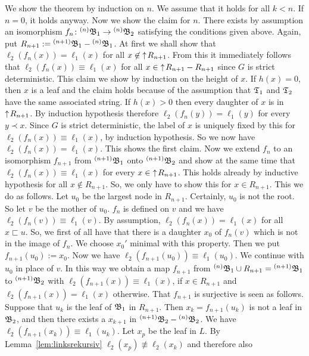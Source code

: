 \proofbeg
We show the theorem by induction on $n$. We assume that it holds
for all $k < n$. If $n = 0$, it holds anyway. Now we show
the claim for $n$. There exists by assumption an isomorphism
$f_n \colon {^{(n)}\mathfrak{B}_1} \rightarrow {^{(n)}\mathfrak{B}_2}$ satisfying the
conditions given above. Again, put $R_{n+1} := {^{(n+1)}\GB_1} %
- {^{(n)}\GB_1}$. At first we shall show that $\ell_2(f_n(x)) =
\ell_1(x)$ for all $x \not\in {\uparrow\! R_{n+1}}$. From this it
immediately follows that $\ell_2(f_n(x)) \equiv \ell_1(x)$ for all
$x \in {\uparrow\! R_{n+1}} - R_{n+1}$ since $G$ is strict
deterministic. This claim we show by induction on the height of
$x$. If $h(x) = 0$, then $x$ is a leaf and the claim holds because
of the assumption that $\mathfrak{T}_1$ and $\mathfrak{T}_2$ have the same
associated string. If $h(x) > 0$ then every daughter of $x$ is in
${\uparrow\! R_{n+1}}$. By induction hypothesis therefore
$\ell_2(f_n(y)) = \ell_1(y)$ for every $y \prec x$. Since $G$ is
strict deterministic, the label of $x$ is uniquely fixed by this
for $\ell_2(f_n(x)) \equiv \ell_1(x)$, by induction hypothesis. So
we now have $\ell_2(f_n(x)) = \ell_1(x)$. This shows the first
claim. Now we extend $f_n$ to an isomorphism $f_{n+1}$ from
${^{(n+1)}\mathfrak{B}_1}$ onto ${^{(n+1)}\mathfrak{B}_2}$ and show at the same time
that $\ell_2(f_n(x)) \equiv \ell_1(x)$ for every $x \in
{\uparrow\! R_{n+1}}$. This holds already by inductive hypothesis for
all $x \not\in R_{n+1}$. So, we only have to show this for $x \in
R_{n+1}$. This we do as follows. Let $u_0$ be the largest node in
$R_{n+1}$. Certainly, $u_0$ is not the root. So let $v$ be the
mother of $u_0$. $f_n$ is defined on $v$ and we have
$\ell_2(f_n(v)) \equiv \ell_1(v)$. By assumption, $\ell_2(f_n(x))
= \ell_1(x)$ for all $x \sqsubset u$. So, we first of all have
that there is a daughter $x_0$ of $f_n(v)$ which is not in the
image of $f_n$. We choose $x_0'$ minimal with this property. Then
we put $f_{n+1}(u_0) := x_0$. Now we have $\ell_2(f_{n+1}(u_0))
\equiv \ell_1(u_0)$. We continue with $u_0$ in place of $v$. In
this way we obtain a map $f_{n+1}$ from ${^{(n)}\mathfrak{B}_1} \cup
R_{n+1} = {^{(n+1)}\mathfrak{B}_1}$ to ${^{(n+1)}\mathfrak{B}_2}$ with
$\ell_2(f_{n+1}(x))  \equiv \ell_1(x)$, if $x \in R_{n+1}$ and
$\ell_2(f_{n+1}(x)) = \ell_1(x)$ otherwise. That $f_{n+1}$ is
surjective is seen as follows. Suppose that $u_k$ is the leaf of
$\mathfrak{B}_1$ in $R_{n+1}$. Then $x_k = f_{n+1}(u_k)$ is not a leaf in
$\mathfrak{B}_2$, and then there exists a $x_{k+1}$ in ${^{(n+1)}\mathfrak{B}_2} -
{^{(n)}\mathfrak{B}_2}$. We have $\ell_2(f_{n+1}(x_k)) \equiv \ell_1(u_k)$.
Let $x_p$ be the leaf in $L$. By Lemma~\ref{lem:linksrekursiv}
$\ell_2(x_p) \not\equiv \ell_2(x_k)$ and therefore also
